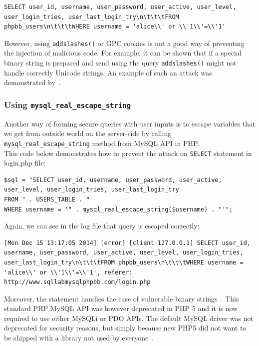 \documentclass[12pt, a4paper, pdflatex]{article}
\begin{document}
\lstset{
	captionpos=b,
	frame=single,
	language=SQL,
	breaklines=true,
	label=sqladdslash
}
\begin{lstlisting}
SELECT user_id, username, user_password, user_active, user_level, user_login_tries, user_last_login_try\n\t\t\tFROM phpbb_users\n\t\t\tWHERE username = 'alice\\' or \\'1\\'=\\'1'
\end{lstlisting}

However, using  \texttt{addslashes()} or GPC cookies is not a good way of preventing the injection of malicious code. For example, it can be shown that if a special binary string is prepared and send using the query \texttt{addslashes()} might not handle correctly Unicode strings. An example of such an attack was demonstrated by~\cite{shiflett06}.

\subsubsection{Using \texttt{mysql\_real\_escape\_string}}
Another way of forming secure queries with user inputs is to escape variables that we get from outside world on the server-side by calling \texttt{mysql\_real\_escape\_string} method from MySQL API in PHP.\\

This code below demonstrates how to prevent the attack on \texttt{SELECT} statement in login.php file:

\lstset{
	captionpos=b,
	frame=single,
	language=PHP,
	breaklines=true,
	label=sqladdslash
}
\begin{lstlisting}
$sql = "SELECT user_id, username, user_password, user_active, user_level, user_login_tries, user_last_login_try
FROM " . USERS_TABLE . "
WHERE username = '" . mysql_real_escape_string($username) . "'";
\end{lstlisting}
Again, we can see in the log file that query is escaped correctly:
\lstset{
	captionpos=b,
	frame=single,
	language=SQL,
	breaklines=true,
	label=sqladdslash
}
\begin{lstlisting}
[Mon Dec 15 13:17:05 2014] [error] [client 127.0.0.1] SELECT user_id, username, user_password, user_active, user_level, user_login_tries, user_last_login_try\n\t\t\tFROM phpbb_users\n\t\t\tWHERE username = 'alice\\' or \\'1\\'=\\'1', referer: http://www.sqllabmysqlphpbb.com/login.php
\end{lstlisting}
Moreover, the statement handles the case of vulnerable binary strings~\cite{shiflett06}. This standard PHP MySQL API was however deprecated in PHP 5 and it is now required to use either MySQLi or PDO APIs. The default MySQL driver was not deprecated for security reasons, but simply because new PHP5 did not want to be shipped with a library not used by everyone~\cite{phpfaq}.
\end{document}
